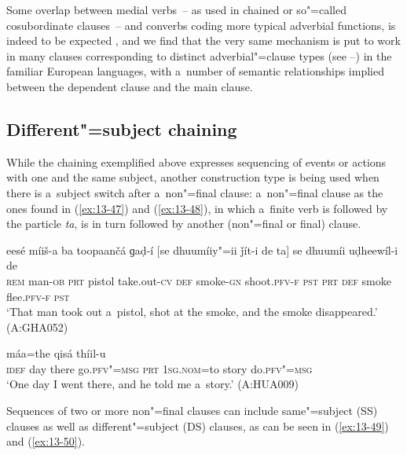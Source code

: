 Some overlap between medial verbs~-- as used in chained or so"=called cosubordinate clauses~-- and converbs coding more typical adverbial functions, is indeed to be expected \citep[26]{haspelmath1995}, and we find that the very same mechanism is put to work in many clauses corresponding to distinct adverbial"=clause types (see --) in the familiar European languages, with a~number of semantic relationships implied between the dependent clause and the main clause. 


\subsection{Different"=subject chaining}
\label{subsec:13-3-2}


While the chaining exemplified above expresses sequencing of events or actions with one and the same subject, another construction type is being used when there is a~subject switch after a~non"=final clause: a~non"=final clause as the ones found in (\ref{ex:13-47}) and (\ref{ex:13-48}), in which a~finite verb is followed by the particle \textit{ta}, is in turn followed by another (non"=final or final) clause.

\begin{exe}
\ex
\label{ex:13-47}
\gll eesé míiš-a ba toopaančá ɡaḍ-í [se dhuumíiy"=ii ǰít-i de ta] se dhuumíi uḍheewíl-i de \\
\textsc{rem} man-\textsc{ob} \textsc{prt} pistol take.out-\textsc{cv} \textsc{def}  smoke-\textsc{gn} shoot.\textsc{pfv-f} \textsc{pst} \textsc{prt} \textsc{def} smoke flee.\textsc{pfv-f} \textsc{pst} \\
\glt `That man took out a~pistol, shot at the smoke, and the smoke disappeared.' (A:GHA052)

\ex
\label{ex:13-48}
 máa=the qisá thíil-u \\
\textsc{idef} day there go.\textsc{pfv"=msg } \textsc{prt} \textsc{1sg.nom}=to story do.\textsc{pfv"=msg}  \\
\glt `One day I went there, and he told me a~story.' (A:HUA009) 
\end{exe}

Sequences of two or more non"=final clauses can include same"=subject (SS) clauses as well as different"=subject (DS) clauses, as can be seen in (\ref{ex:13-49}) and (\ref{ex:13-50}).

